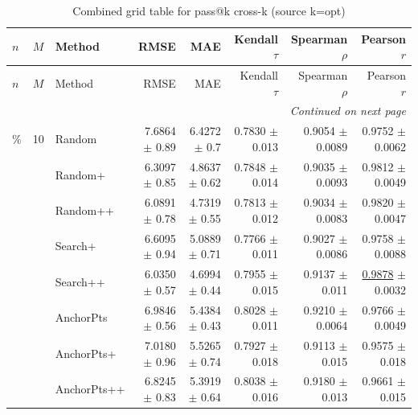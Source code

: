 \footnotesize
\setlength{\tabcolsep}{2pt}
\renewcommand{\arraystretch}{1.05}
\setlength{\LTpre}{0pt}
\setlength{\LTpost}{0pt}
\setlength{\LTleft}{\fill}
\setlength{\LTright}{\fill}
\begin{longtable}{llp{}rrrrr}
\caption{Combined grid table for pass@k cross-k (source k=opt)}\label{tab:combined\_grid\_passk\_kopt}\\
\toprule
$n$ & $M$ & Method & RMSE & MAE & Kendall $\tau$ & Spearman $\rho$ & Pearson $r$ \\
\midrule
\endfirsthead
\toprule
$n$ & $M$ & Method & RMSE & MAE & Kendall $\tau$ & Spearman $\rho$ & Pearson $r$ \\
\midrule
\endhead
\midrule
\multicolumn{8}{r}{\emph{Continued on next page}} \\
\midrule
\endfoot
\bottomrule
\endlastfoot
5\% & 10 & Random & 7.6864 {\scriptsize $\pm$ 0.89} & 6.4272 {\scriptsize $\pm$ 0.7} & 0.7830 {\scriptsize $\pm$ 0.013} & 0.9054 {\scriptsize $\pm$ 0.0089} & 0.9752 {\scriptsize $\pm$ 0.0062} \\
 &  & Random+ & 6.3097 {\scriptsize $\pm$ 0.85} & 4.8637 {\scriptsize $\pm$ 0.62} & 0.7848 {\scriptsize $\pm$ 0.014} & 0.9035 {\scriptsize $\pm$ 0.0093} & 0.9812 {\scriptsize $\pm$ 0.0049} \\
 &  & Random++ & 6.0891 {\scriptsize $\pm$ 0.78} & 4.7319 {\scriptsize $\pm$ 0.55} & 0.7813 {\scriptsize $\pm$ 0.012} & 0.9034 {\scriptsize $\pm$ 0.0083} & 0.9820 {\scriptsize $\pm$ 0.0047} \\
 &  & Search+ & 6.6095 {\scriptsize $\pm$ 0.94} & 5.0889 {\scriptsize $\pm$ 0.71} & 0.7766 {\scriptsize $\pm$ 0.011} & 0.9027 {\scriptsize $\pm$ 0.0086} & 0.9758 {\scriptsize $\pm$ 0.0088} \\
 &  & Search++ & 6.0350 {\scriptsize $\pm$ 0.57} & 4.6994 {\scriptsize $\pm$ 0.44} & 0.7955 {\scriptsize $\pm$ 0.015} & 0.9137 {\scriptsize $\pm$ 0.011} & \underline{0.9878} {\scriptsize $\pm$ 0.0032} \\
 &  & AnchorPts & 6.9846 {\scriptsize $\pm$ 0.56} & 5.4384 {\scriptsize $\pm$ 0.43} & 0.8028 {\scriptsize $\pm$ 0.011} & 0.9210 {\scriptsize $\pm$ 0.0064} & 0.9766 {\scriptsize $\pm$ 0.0049} \\
 &  & AnchorPts+ & 7.0180 {\scriptsize $\pm$ 0.96} & 5.5265 {\scriptsize $\pm$ 0.74} & 0.7927 {\scriptsize $\pm$ 0.018} & 0.9113 {\scriptsize $\pm$ 0.015} & 0.9575 {\scriptsize $\pm$ 0.018} \\
 &  & AnchorPts++ & 6.8245 {\scriptsize $\pm$ 0.83} & 5.3919 {\scriptsize $\pm$ 0.64} & 0.8038 {\scriptsize $\pm$ 0.016} & 0.9180 {\scriptsize $\pm$ 0.013} & 0.9661 {\scriptsize $\pm$ 0.015} \\

\end{longtable}
